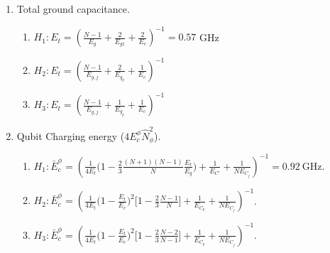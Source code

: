 \documentclass[%
reprint,
superscriptaddress,
 amsmath,amssymb,
 aps,
 prx,
longbibliography,
floatfix,
]{revtex4-2}
\begin{document}
\begin{enumerate}
    \item Total ground capacitance.
    \begin{enumerate}
        \item $H_1: E_t=(\frac{N-1}{E_g}+\frac{2}{E_{g1}}+\frac{2}{E_c})^{-1}=0.57 $ GHz
    \item $H_2: E_t=(\frac{N-1}{E_{g,j}}+\frac{2}{E_{g_p}}+\frac{1}{E_c})^{-1}$
    \item $H_3: E_t=(\frac{N-1}{E_{g,j}}+\frac{1}{E_{g_p}}+\frac{1}{E_c})^{-1}$
    \end{enumerate}
\item Qubit Charging energy ($4E_c^\phi \hat N_{\phi}^2$). 
    \begin{enumerate}
    \item $H_1:\bar{E}_c^\phi=(\frac{1}{4E_t}\Big(1-\frac{2}{3}\frac{(N+1)(N-1)}{N}\frac{E_t}{E_g}\Big)+\frac{1}{E_{C'}}+\frac{1}{NE_{C_j}})^{-1}=0.92 \ \mathrm{GHz}$.
    \item $H_2: \bar{E}_c^\phi=(\frac{1}{4E_t}\Big(1-\frac{E_t}{E_c}\Big)^2\Big[1-\frac{2}{3}\frac{N-1}{N}\Big]+\frac{1}{E_{C_p}}+\frac{1}{NE_{C_j}})^{-1}$. 
    \item  $H_3: \bar{E}_c^\phi=(\frac{1}{4E_t}\Big(1-\frac{E_t}{E_c}\Big)^2\Big[1-\frac{2}{3}\frac{N-2}{N-1}\Big]+\frac{1}{E_{C_p}}+\frac{1}{NE_{C_j}})^{-1}$.
    \end{enumerate}
    

\end{enumerate}
\end{document}
